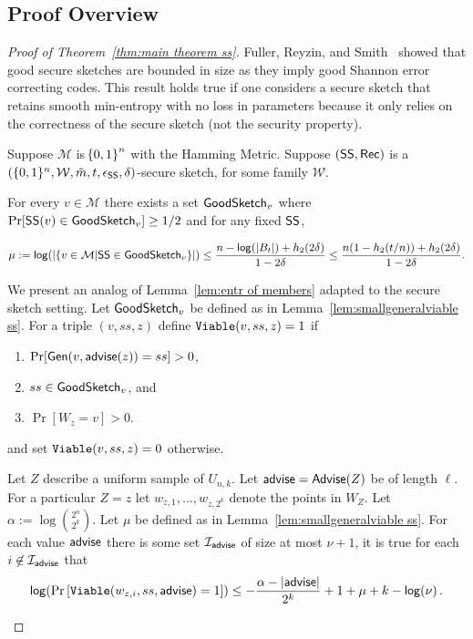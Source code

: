 \subsection{Proof Overview}
\begin{proof}[Proof of Theorem~\ref{thm:main theorem ss}]

Fuller, Reyzin, and Smith~\cite[Lemma 7.3]{fuller2020fuzzy} showed that good secure sketches are bounded in size as they imply good Shannon error correcting codes.  This result holds true if one considers a secure sketch that retains smooth min-entropy with no loss in parameters because it only relies on the correctness of the secure sketch (not the security property).  

\begin{lemma}
\label{lem:smallgeneralviable ss}
    Suppose $\mathcal{M}$ is $\!\left\{ 0,1 \right\}^{n}$ with the Hamming Metric. Suppose $({\mathsf{SS}}, {\mathsf{Rec}})$ is a $(\{0, 1\}^n, \mathcal{W}, \tilde{m}, t, \epsilon_{\mathsf{SS}}, \delta)$-secure sketch, for some family $\mathcal{W}$. 
    
   For every $v\in \mathcal{M}$ there exists a set $\mathsf{GoodSketch}_v$ where $\Pr[{\mathsf{SS}}(v)\in \mathsf{GoodSketch}_v] \ge 1/2$ and for any fixed ${\mathsf{SS}}$,
    
    \[
   \mu:= \mathsf{log}\!\left(|\{v \in \mathcal{M} | {\mathsf{SS}} \in \mathsf{GoodSketch}_v\}|\right) \le \frac{n - \mathsf{log}\!\left(|B_t|\right) +h_2(2\delta)}{1-2\delta} \le \frac{n(1-h_2(t/n)) +h_2(2\delta)}{1-2\delta}.
    \]
\end{lemma}

We present an analog of Lemma~\ref{lem:entr of members} adapted to the secure sketch setting. Let $\mathsf{GoodSketch}_v$ be defined as in Lemma~\ref{lem:smallgeneralviable ss}. For a triple $(v, ss, z)$ define $\mathtt{Viable}(v, ss, z)=1$ if
\begin{enumerate}
\itemsep0em
\item $\Pr[{\mathsf{Gen}}(v, {\mathsf{advise}}(z)) = ss]>0$,
\item $ss\in\mathsf{GoodSketch}_v$, and
\item $\Pr[W_z = v]>0$.
\end{enumerate}
and set $\mathtt{Viable}(v, ss, z)=0$ otherwise. 

\begin{lemma}
\label{lem:ent members ss}
Let $Z$ describe a uniform sample of $U_{n,k}$.  Let ${\mathsf{advise}} = {\mathsf{Advise}}(Z)$ be of length $\ell$.
 For a particular $Z=z$ let $w_{z,1},..., w_{z,2^k}$ denote the points in $W_Z$. Let $\alpha:= \log {2^n\choose 2^k}$.  Let $\mu$ be defined as in Lemma~\ref{lem:smallgeneralviable ss}. 
For each value ${\mathsf{advise}}$ there is some set $\mathcal{I}_{{\mathsf{advise}}}$ of size at most $\nu+1$, it is true for each $i\not \in \mathcal{I}_{\mathsf{advise}}$ that
\[
\mathsf{log}\!\left(\Pr\left[\mathtt{Viable}(w_{z,i}, ss, {\mathsf{advise}}) = 1 \right]\right)\le -\frac{\alpha -|{\mathsf{advise}}| }{2^k}+1+\mu+k-\mathsf{log}\!\left(\nu\right).
\]
\end{lemma}


\end{proof}
